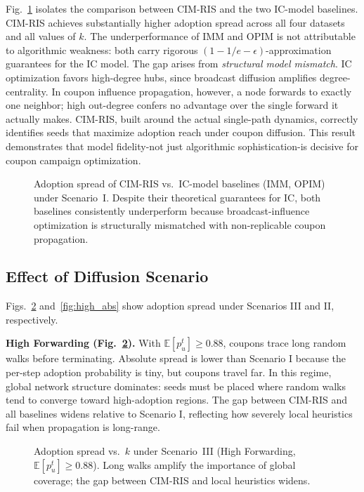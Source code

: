 \documentclass[sigconf]{acmart}
\newcommand{\CIMRIS}{\textsc{CIM-RIS}}
\newcommand{\E}{\mathbb{E}}
\begin{document}
Fig.~\ref{fig:ic_compare} isolates the comparison between \CIMRIS{} and
the two IC-model baselines.
\CIMRIS{} achieves substantially higher adoption spread across all four
datasets and all values of $k$.
The underperformance of IMM and OPIM is not attributable to algorithmic
weakness: both carry rigorous $(1{-}1/e{-}\epsilon)$-approximation
guarantees for the IC model.
The gap arises from \emph{structural model mismatch}.
IC optimization favors high-degree hubs, since broadcast diffusion
amplifies degree-centrality.
In coupon influence propagation, however, a node forwards to exactly one
neighbor; high out-degree confers no advantage over the single forward
it actually makes.
\CIMRIS{}, built around the actual single-path dynamics, correctly
identifies seeds that maximize adoption reach under coupon diffusion.
This result demonstrates that model fidelity-not just algorithmic
sophistication-is decisive for coupon campaign optimization.

\begin{figure}[t]
  \centering
  \caption{Adoption spread of \CIMRIS{} vs.\ IC-model baselines (IMM,
    OPIM) under Scenario~I.
    Despite their theoretical guarantees for IC, both baselines
    consistently underperform because broadcast-influence optimization
    is structurally mismatched with non-replicable coupon propagation.}
  \label{fig:ic_compare}
\end{figure}

\subsection{Effect of Diffusion Scenario}
\label{sec:exp-scenario}

Figs.~\ref{fig:high_fwd} and~\ref{fig:high_abs} show adoption spread
under Scenarios III and II, respectively.

\textbf{High Forwarding (Fig.~\ref{fig:high_fwd}).}
With $\E[p_u^t] \geq 0.88$, coupons trace long random walks before
terminating.
Absolute spread is lower than Scenario I because the per-step adoption
probability is tiny, but coupons travel far.
In this regime, global network structure dominates: seeds must be placed
where random walks tend to converge toward high-adoption regions.
The gap between \CIMRIS{} and all baselines widens relative to Scenario
I, reflecting how severely local heuristics fail when propagation is
long-range.

\begin{figure}[t]
  \centering
  \caption{Adoption spread vs.\ $k$ under Scenario~III (High
    Forwarding, $\E[p_u^t] \geq 0.88$).
    Long walks amplify the importance of global coverage; the gap
    between \CIMRIS{} and local heuristics widens.}
  \label{fig:high_fwd}
\end{figure}
\end{document}
